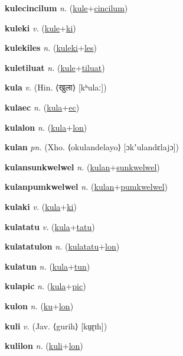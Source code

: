 \textbf{\hypertarget{kulecincilum}{kulecincilum}} \textit{n.} (\hyperlink{kule}{kule}+\allowbreak \hyperlink{cincilum}{cincilum})


\textbf{\hypertarget{kuleki}{kuleki}} \textit{v.} (\hyperlink{kule}{kule}+\allowbreak \hyperlink{ki}{ki})


\textbf{\hypertarget{kulekiles}{kulekiles}} \textit{n.} (\hyperlink{kuleki}{kuleki}+\allowbreak \hyperlink{les}{les})


\textbf{\hypertarget{kuletiluat}{kuletiluat}} \textit{n.} (\hyperlink{kule}{kule}+\allowbreak \hyperlink{tiluat}{tiluat})


\textbf{\hypertarget{kula}{kula}} \textit{v.} (Hin. ⟨{\devanagari{}खुला}⟩ [kʰulaː])


\textbf{\hypertarget{kulaec}{kulaec}} \textit{n.} (\hyperlink{kula}{kula}+\allowbreak \hyperlink{ec}{ec})


\textbf{\hypertarget{kulalon}{kulalon}} \textit{n.} (\hyperlink{kula}{kula}+\allowbreak \hyperlink{lon}{lon})


\textbf{\hypertarget{kulan}{kulan}} \textit{pn.} (Xho. ⟨okulandelayo⟩ [ɔkʼulandɛlajɔ])


\textbf{\hypertarget{kulansunkwelwel}{kulansunkwelwel}} \textit{n.} (\hyperlink{kulan}{kulan}+\allowbreak \hyperlink{sunkwelwel}{sunkwelwel})


\textbf{\hypertarget{kulanpumkwelwel}{kulanpumkwelwel}} \textit{n.} (\hyperlink{kulan}{kulan}+\allowbreak \hyperlink{pumkwelwel}{pumkwelwel})


\textbf{\hypertarget{kulaki}{kulaki}} \textit{v.} (\hyperlink{kula}{kula}+\allowbreak \hyperlink{ki}{ki})


\textbf{\hypertarget{kulatatu}{kulatatu}} \textit{v.} (\hyperlink{kula}{kula}+\allowbreak \hyperlink{tatu}{tatu})


\textbf{\hypertarget{kulatatulon}{kulatatulon}} \textit{n.} (\hyperlink{kulatatu}{kulatatu}+\allowbreak \hyperlink{lon}{lon})


\textbf{\hypertarget{kulatun}{kulatun}} \textit{n.} (\hyperlink{kula}{kula}+\allowbreak \hyperlink{tun}{tun})


\textbf{\hypertarget{kulapic}{kulapic}} \textit{n.} (\hyperlink{kula}{kula}+\allowbreak \hyperlink{pic}{pic})


\textbf{\hypertarget{kulon}{kulon}} \textit{n.} (\hyperlink{ku}{ku}+\allowbreak \hyperlink{lon}{lon})


\textbf{\hypertarget{kuli}{kuli}} \textit{v.} (Jav. ⟨gurih⟩ [kṳɽɪh])


\textbf{\hypertarget{kulilon}{kulilon}} \textit{n.} (\hyperlink{kuli}{kuli}+\allowbreak \hyperlink{lon}{lon})


